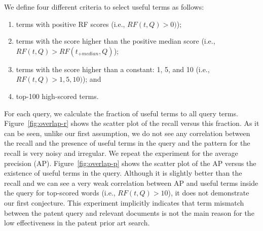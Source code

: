 We define four different criteria to select useful terms as follows:
\begin{enumerate}
\item terms with positive RF scores (i.e., $ RF(t, Q)>0) $);
\item terms with the score higher than the positive median score (i.e., $ RF(t, Q)>RF(t_{+median}, Q) $);
\item terms with the score higher than a constant: 1, 5, and 10 (i.e., $ RF(t, Q)>1, 5, 10) $); and
\item top-100 high-scored terms.
\end{enumerate}
For each query, we calculate the fraction of useful terms to all query terms. 
Figure~\ref{fig:overlap-r} shows the scatter plot of the recall versus this fraction. 
As it can be seen, unlike our first assumption, we do not see any correlation between the recall and the presence of useful terms in the query and the pattern for the recall is very noisy and irregular. 
We repeat the experiment for the average precision (AP). Figure~\ref{fig:overlap-p} shows the scatter plot of the AP versus the existence of useful terms in the query. Although it is slightly better than the recall and we can see a very weak correlation between AP and useful terms inside the query for top-scored words (i.e., $RF(t, Q)>10$), it does not demonstrate our first conjecture. 
This experiment implicitly indicates that term mismatch between the patent query and relevant documents is 
not the main reason for the low effectiveness in the patent prior art search. 
